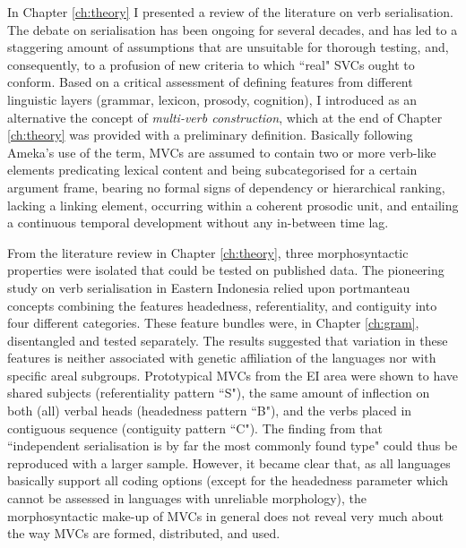In Chapter \ref{ch:theory} I presented a review of the literature on verb serialisation. The debate on serialisation has been ongoing for several decades, and has led to a staggering amount of assumptions that are unsuitable for thorough testing, and, consequently, to a profusion of new criteria to which ``real" SVCs ought to conform. Based on a critical assessment of defining features from different linguistic layers (grammar, lexicon, prosody, cognition), I introduced as an alternative the concept of \textit{multi-verb construction}, which at the end of Chapter \ref{ch:theory} was provided with a preliminary definition. Basically following Ameka's use of the term, MVCs are assumed to contain two or more verb-like elements predicating lexical content and being subcategorised for a certain argument frame, bearing no formal signs of dependency or hierarchical ranking, lacking a linking element, occurring within a coherent prosodic unit, and entailing a continuous temporal development without any in-between time lag. 

From the literature review in Chapter \ref{ch:theory}, three morphosyntactic properties were isolated that could be tested on published data. The pioneering study on verb serialisation in Eastern Indonesia \citep{vanstaden2008serial} relied upon portmanteau concepts combining the features headedness, referentiality, and contiguity into four different categories. These feature bundles were, in Chapter \ref{ch:gram}, disentangled and tested separately. The results suggested that variation in these features is neither associated with genetic affiliation of the languages nor with specific areal subgroups. Prototypical MVCs from the EI area were shown to have shared subjects (referentiality pattern ``S"), the same amount of inflection on both (all) verbal heads (headedness pattern ``B"), and the verbs placed in contiguous sequence (contiguity pattern ``C"). The finding from \citet[48]{vanstaden2008serial} that ``independent serialisation is by far the most commonly found type" could thus be reproduced with a larger sample. However, it became clear that, as all languages basically support all coding options (except for the headedness parameter which cannot be assessed in languages with unreliable morphology), the morphosyntactic make-up of MVCs in general does not reveal very much about the way MVCs are formed, distributed, and used.


